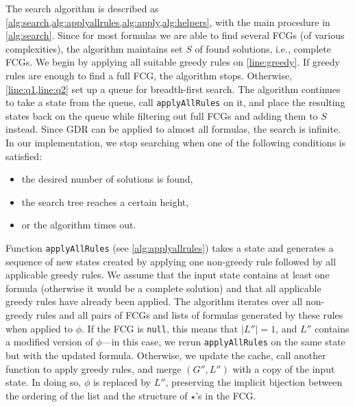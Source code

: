 The search algorithm is described as
\cref{alg:search,alg:applyallrules,alg:apply,alg:helpers}, with the main
procedure in \cref{alg:search}. Since for most formulas we are able to find
several FCGs (of various complexities), the algorithm maintains set $S$ of found
solutions, i.e., complete FCGs. We begin by applying all suitable greedy rules
on \cref{line:greedy}. If greedy rules are enough to find a full FCG, the
algorithm stops. Otherwise, \cref{line:q1,line:q2} set up a queue for
breadth-first search. The algorithm continues to take a state from the queue,
call \texttt{applyAllRules} on it, and place the resulting states back on the
queue while filtering out full FCGs and adding them to $S$ instead. Since GDR
can be applied to almost all formulas, the search is infinite. In our
implementation, we stop searching when one of the following conditions is
satisfied:
\begin{itemize}
  \item the desired number of solutions is found,
  \item the search tree reaches a certain height,
  \item or the algorithm times out.
\end{itemize}


Function \texttt{applyAllRules} (see \cref{alg:applyallrules}) takes a state and
generates a sequence of new states created by applying one non-greedy rule
followed by all applicable greedy rules. We assume that the input state contains
at least one formula (otherwise it would be a complete solution) and that all
applicable greedy rules have already been applied. The algorithm iterates over
all non-greedy rules and all pairs of FCGs and lists of formulas generated by
these rules when applied to $\phi$. If the FCG is \texttt{null}, this means that
$|L''| = 1$, and $L''$ contains a modified version of $\phi$---in this case, we
rerun \texttt{applyAllRules} on the same state but with the updated formula.
Otherwise, we update the cache, call another function to apply greedy rules, and
merge $(G'', L'')$ with a copy of the input state. In doing so, $\phi$ is
replaced by $L''$, preserving the implicit bijection between the ordering of the
list and the structure of $\star$'s in the FCG\@.

